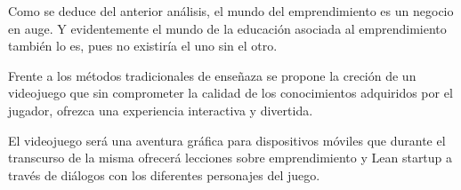 Como se deduce del anterior análisis, el mundo del emprendimiento es un negocio en auge. Y evidentemente el mundo de la educación asociada al emprendimiento también lo es, pues no existiría el uno sin el otro.

Frente a los métodos tradicionales de enseñaza se propone la creción de un videojuego que sin comprometer la calidad de los conocimientos adquiridos por el jugador, ofrezca una experiencia interactiva y divertida.

El videojuego será una aventura gráfica para dispositivos móviles que durante el transcurso de la misma ofrecerá lecciones sobre emprendimiento y Lean startup a través de diálogos con los diferentes personajes del juego.